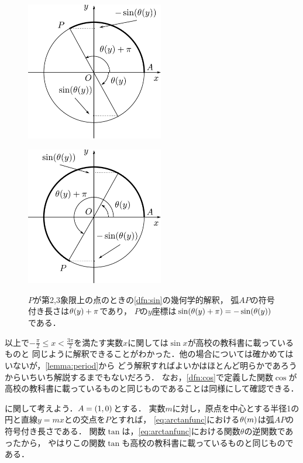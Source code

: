 \documentclass[11pt,a4paper]{ltjsarticle}
\newcommand*{\coord}[1]{\paren{#1}}
\theoremstyle{definition}
\begin{document}
\begin{figure}[htbp]
  \begin{minipage}{.45\linewidth}
    \centering
    \includegraphics[width=60mm]{fig/circle2.pdf}
    \label{fig:circle2}
  \end{minipage}
  \begin{minipage}{.45\linewidth}
    \centering
    \includegraphics[width=60mm]{fig/circle3.pdf}
    \label{fig:circle3}
  \end{minipage}
  \caption{$P$が第2,3象限上の点のときの\cref{dfn:sin}の幾何学的解釈，
    弧$AP$の符号付き長さは$\apply{\theta}{y} + \pi$であり，
  $P$の$y$座標は$\apply{\sin}{\apply{\theta}{y} + \pi} = - \apply{\sin}{\apply{\theta}{y}}$である．}
  \label{fig:circle23}
\end{figure}

以上で$-\frac{\pi}{2} \leq x < \frac{3\pi}{2}$を満たす実数$x$に関しては$\sin x$が高校の教科書に載っているものと
同じように解釈できることがわかった．他の場合については確かめてはいないが，\cref{lemma:period}から
どう解釈すればよいかはほとんど明らかであろうからいちいち解説するまでもないだろう．
なお，\cref{dfn:cos}で定義した関数$\cos$が高校の教科書に載っているものと同じものであることは同様にして確認できる．

に関して考えよう．$A = \coord{1,0}$とする．
実数$m$に対し，原点を中心とする半径1の円と直線$y = mx$との交点を$P$とすれば，
\cref{eq:arctanfunc}における$\apply{\theta}{m}$は弧$AP$の符号付き長さである．
関数$\tan$は，\cref{eq:arctanfunc}における関数$\theta$の逆関数であったから，
やはりこの関数$\tan$も高校の教科書に載っているものと同じものである．
\end{document}
